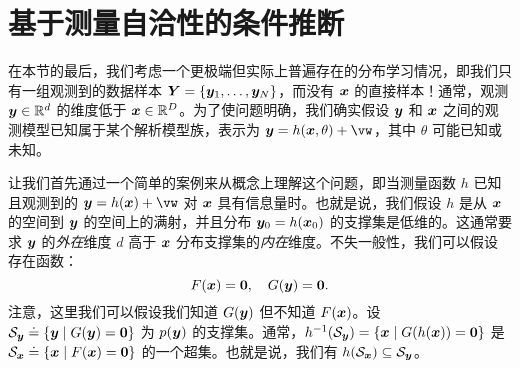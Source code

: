 \documentclass[../../book-main.tex]{subfiles}
\begin{document}



\section{基于测量自洽性的条件推断}
\label{sec:measurement-self-consistency}
在本节的最后，我们考虑一个更极端但实际上普遍存在的分布学习情况，即我们只有一组观测到的数据样本 $\bm{Y} = \{\bm{y}_1,\ldots, \bm{y}_N\}$，而没有 $\bm{x}$ 的直接样本！通常，观测 $\bm{y} \in \mathbb{R}^d$ 的维度低于 $\bm{x} \in \mathbb{R}^D$。为了使问题明确，我们确实假设 $\bm{y}$ 和 $\bm{x}$ 之间的观测模型已知属于某个解析模型族，表示为 $\y = h(\x, \theta) +\vw$，其中 $\theta$ 可能已知或未知。

让我们首先通过一个简单的案例来从概念上理解这个问题，即当测量函数 $h$ 已知且观测到的 $\y = h(\x) + \vw$ 对 $\bm{x}$ 具有信息量时。也就是说，我们假设 $h$ 是从 $\bm{x}$ 的空间到 $\bm{y}$ 的空间上的满射，并且分布 $\bm{y}_0 = h(\bm{x}_0)$ 的支撑集是低维的。这通常要求 $\bm{y}$ 的\textit{外在}维度 $d$ 高于 $\bm{x}$ 分布支撑集的\textit{内在}维度。不失一般性，我们可以假设存在函数：
\begin{equation}
F(\bm{x}) = \boldsymbol{0},\quad     G(\bm{y}) = \boldsymbol{0}.
\end{equation}
注意，这里我们可以假设我们知道 $G(\bm{y})$ 但不知道 $F(\bm{x})$。设 $\mathcal{S}_{\bm{y}} \doteq \{\bm{y} \mid G(\bm{y}) = \boldsymbol{0}\}$ 为 $p(\bm{y})$ 的支撑集。通常，$h^{-1}(\mathcal{S}_{\bm{y}}) = \{\bm{x} \mid G(h(\bm{x})) = \boldsymbol{0}\}$ 是 $\mathcal{S}_{\bm{x}} \doteq \{\bm{x} \mid F(\bm{x}) = \boldsymbol{0}\}$ 的一个超集。也就是说，我们有 $h(\mathcal{S}_{\bm{x}}) \subseteq \mathcal{S}_{\bm{y}}$。
\end{document}
